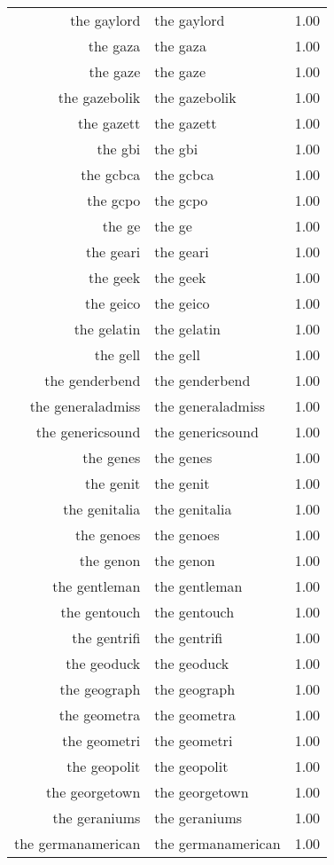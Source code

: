 \begin{table}[ht]
\begin{tabular}{rlr}
  the gaylord & the gaylord & 1.00 \\ 
  the gaza & the gaza & 1.00 \\ 
  the gaze & the gaze & 1.00 \\ 
  the gazebolik & the gazebolik & 1.00 \\ 
  the gazett & the gazett & 1.00 \\ 
  the gbi & the gbi & 1.00 \\ 
  the gcbca & the gcbca & 1.00 \\ 
  the gcpo & the gcpo & 1.00 \\ 
  the ge & the ge & 1.00 \\ 
  the geari & the geari & 1.00 \\ 
  the geek & the geek & 1.00 \\ 
  the geico & the geico & 1.00 \\ 
  the gelatin & the gelatin & 1.00 \\ 
  the gell & the gell & 1.00 \\ 
  the genderbend & the genderbend & 1.00 \\ 
  the generaladmiss & the generaladmiss & 1.00 \\ 
  the genericsound & the genericsound & 1.00 \\ 
  the genes & the genes & 1.00 \\ 
  the genit & the genit & 1.00 \\ 
  the genitalia & the genitalia & 1.00 \\ 
  the genoes & the genoes & 1.00 \\ 
  the genon & the genon & 1.00 \\ 
  the gentleman & the gentleman & 1.00 \\ 
  the gentouch & the gentouch & 1.00 \\ 
  the gentrifi & the gentrifi & 1.00 \\ 
  the geoduck & the geoduck & 1.00 \\ 
  the geograph & the geograph & 1.00 \\ 
  the geometra & the geometra & 1.00 \\ 
  the geometri & the geometri & 1.00 \\ 
  the geopolit & the geopolit & 1.00 \\ 
  the georgetown & the georgetown & 1.00 \\ 
  the geraniums & the geraniums & 1.00 \\ 
  the germanamerican & the germanamerican & 1.00 \\ 

\end{tabular}
\end{table}
